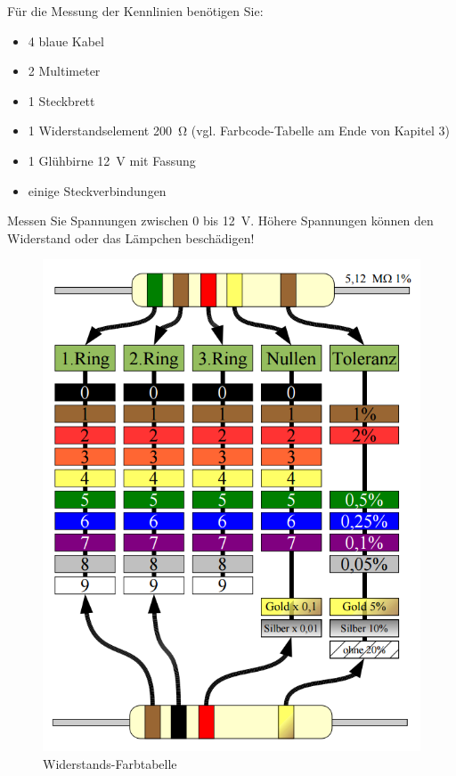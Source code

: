 \documentclass[11pt,twoside=false,open=any]{scrbook}
\begin{document}
\begin{tcolorbox}[breakable,colback=gray!20, title=Versuch 1: Kennlinie von Glühlampe und Widerstandselement]
Für die Messung der Kennlinien benötigen Sie:
\begin{itemize}
    \item 4 blaue Kabel
    \item 2 Multimeter
    \item 1 Steckbrett
    \item 1 Widerstandselement \SI{200}{\ohm} (vgl. Farbcode-Tabelle am Ende von Kapitel 3)
    \item 1 Glühbirne \SI{12}{V} mit Fassung
    \item einige Steckverbindungen
\end{itemize}
Messen Sie Spannungen zwischen 0 bis \SI{12}{V}. Höhere Spannungen können den Widerstand oder das Lämpchen beschädigen!
\end{tcolorbox}

\begin{figure}[h]
\centering
   \includegraphics[width=12cm]{Bilder/Widerstand.png}
\caption{Widerstands-Farbtabelle}
\label{fig:widerstand}
\end{figure}
\end{document}
